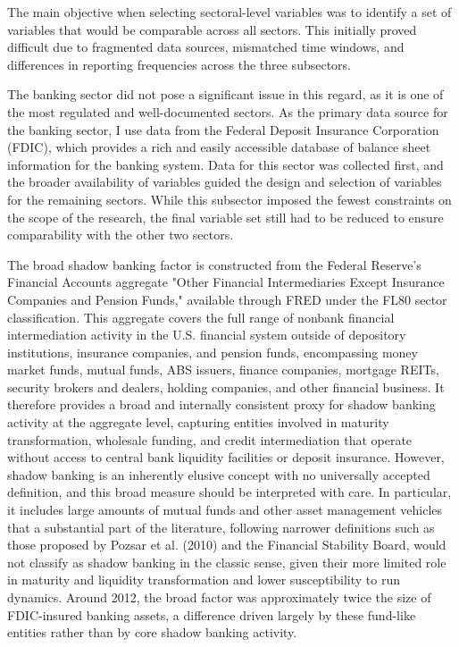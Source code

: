 \documentclass[12pt,a4paper]{report}\usepackage[a4paper, top=2.5cm, bottom=2.5cm, left=2.5cm, right=2.5cm]{geometry}
\begin{document}
The main objective when selecting sectoral-level variables was to identify a set of variables that
would be comparable across all sectors. This initially proved difficult due to fragmented data
sources, mismatched time windows, and differences in reporting frequencies across the three
subsectors.

The banking sector did not pose a significant issue in this regard, as it is one of the most
regulated and well-documented sectors. As the primary data source for the banking sector, I use data
from the Federal Deposit Insurance Corporation (FDIC), which provides a rich and easily accessible
database of balance sheet information for the banking system. Data for this sector was collected
first, and the broader availability of variables guided the design and selection of variables for
the remaining sectors. While this subsector imposed the fewest constraints on the scope of the
research, the final variable set still had to be reduced to ensure comparability with the other two
sectors.

The broad shadow banking factor is constructed from the Federal Reserve's Financial Accounts aggregate "Other Financial Intermediaries Except Insurance Companies and Pension Funds," available through FRED under the FL80 sector classification. This aggregate covers the full range of nonbank financial intermediation activity in the U.S. financial system outside of depository institutions, insurance companies, and pension funds, encompassing money market funds, mutual funds, ABS issuers, finance companies, mortgage REITs, security brokers and dealers, holding companies, and other financial business. It therefore provides a broad and internally consistent proxy for shadow banking activity at the aggregate level, capturing entities involved in maturity transformation, wholesale funding, and credit intermediation that operate without access to central bank liquidity facilities or deposit insurance. However, shadow banking is an inherently elusive concept with no universally accepted definition, and this broad measure should be interpreted with care. In particular, it includes large amounts of mutual funds and other asset management vehicles that a substantial part of the literature, following narrower definitions such as those proposed by Pozsar et al. (2010) and the Financial Stability Board, would not classify as shadow banking in the classic sense, given their more limited role in maturity and liquidity transformation and lower susceptibility to run dynamics. Around 2012, the broad factor was approximately twice the size of FDIC-insured banking assets, a difference driven largely by these fund-like entities rather than by core shadow banking activity.
\end{document}
